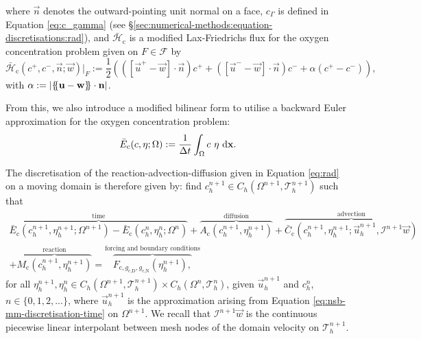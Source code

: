             where $\vec{n}$ denotes the outward-pointing unit normal on a face, $c_\Gamma$ is defined in Equation \eqref{eq:c_gamma} (see \S\ref{sec:numerical-methods:equation-discretisations:rad}), and $\bar{\mathcal{H}}_\text{c}$ is a modified Lax-Friedrichs flux for the oxygen concentration problem given on $F \in \mathcal{F}$ by
            \begin{equation}
                \bar{\mathcal{H}}_\text{c}(c^+, c^-, \vec{n}; \vec{w})|_F := \frac{1}{2}(([\vec{u}^+ - \vec{w}] \cdot \vec{n}) c^+ + ([\vec{u}^- - \vec{w}] \cdot \vec{n}) c^- + \alpha(c^+ - c^-)),
            \end{equation}
            with $\alpha := |\{\negthickspace\{\boldsymbol{\mathbf{u}} - \boldsymbol{\mathbf{w}}\}\negthickspace\} \cdot \boldsymbol{\mathbf{n}}|$.
            
            From this, we also introduce a modified bilinear form to utilise a backward Euler approximation for the oxygen concentration problem:
            \begin{equation}
                \bar{E}_\text{c}(c, \eta; \Omega) := \frac{1}{\Delta t} \int_\Omega c ~ \eta ~\mathrm{d} \boldsymbol{\mathbf{x}}.
            \end{equation}

            The discretisation of the reaction-advection-diffusion given in Equation \eqref{eq:rad} on a moving domain is therefore given by: find $c^{n+1}_h \in C_h(\Omega^{n+1}, \mathcal{T}^{n+1}_h)$ such that
            \begin{multline}
                \overbrace{\bar{E}_\text{c}(c^{n+1}_h, \eta^{n+1}_h; \Omega^{n+1}) - \bar{E}_\text{c}(c^n_h, \eta^n_h; \Omega^n)}^{\text{time}} + \overbrace{A_\text{c}(c^{n+1}_h, \eta^{n+1}_h)}^{\text{diffusion}} + \overbrace{\bar{C}_\text{c}(c^{n+1}_h, \eta^{n+1}_h; \vec{u}^{n+1}_h, \mathcal{I}^{n+1}\vec{w})}^{\text{advection}} \\ + \overbrace{M_\text{c}(c^{n+1}_h, \eta^{n+1}_h)}^{\text{reaction}} = \overbrace{F_{\text{c},g_\text{c,D},g_\text{c,N}}(\eta^{n+1}_h),}^{\text{forcing and boundary conditions}}
                \label{eq:mm-rad-discretisation}
            \end{multline}
            for all $\eta^{n+1}_h, \eta^n_h \in C_h(\Omega^{n+1}, \mathcal{T}^{n+1}_h) \times C_h(\Omega^n, \mathcal{T}^n_h)$, given $\vec{u}^{n+1}_h$ and $c^n_h$, $n \in \{0, 1, 2, ...\}$, where $\vec{u}^{n+1}_h$ is the approximation arising from Equation \eqref{eq:nsb-mm-discretisation-time} on $\Omega^{n+1}$. We recall that $\mathcal{I}^{n+1}\vec{w}$ is the continuous piecewise linear interpolant between mesh nodes of the domain velocity on $\mathcal{T}_h^{n+1}$.

